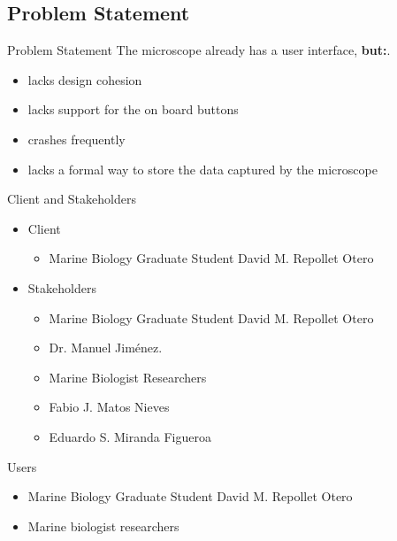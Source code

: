 \documentclass[14pt, aspectratio=169]{beamer}
\begin{document}
\subsection{Problem Statement}
\begin{frame}{Problem Statement}
	The microscope already has a user interface, \textbf{but:}.
	\begin{itemize}
		\item lacks design cohesion
		\item lacks support for the on board buttons
		\item crashes frequently
		\item lacks a formal way to store the data captured by the microscope
	\end{itemize}
\end{frame}
\begin{frame}{Client and Stakeholders}
	\begin{itemize}
		\item Client
		      \begin{itemize}
			      \item Marine Biology Graduate Student David M. Repollet Otero
		      \end{itemize}
		\item Stakeholders
		      \begin{itemize}
			      \item Marine Biology Graduate Student David M. Repollet Otero
			      \item Dr. Manuel Jiménez.
			      \item Marine Biologist Researchers
			      \item Fabio J. Matos Nieves
			      \item Eduardo S. Miranda Figueroa
		      \end{itemize}
	\end{itemize}
\end{frame}
\begin{frame}{Users}
	\begin{itemize}
		\item Marine Biology Graduate Student David M. Repollet Otero
		\item Marine biologist researchers
	\end{itemize}
\end{frame}
\end{document}
